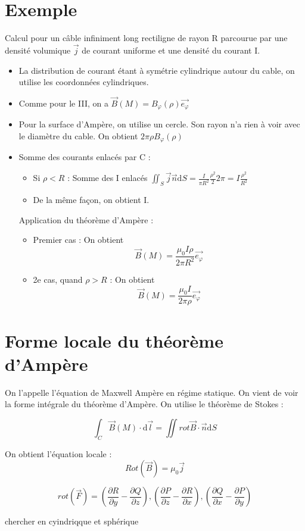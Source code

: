 \documentclass[french]{yLectureNote}
\renewcommand{\vec}{\overrightarrow}
\newcommand{\dd}{\mathrm{d}}
\newcommand{\B}{\vec{B}(M)}
\newcommand{\ep}{\vec{e_{\varphi}}}
\begin{document}
\section{Exemple}
Calcul pour un c\^able infiniment long rectiligne de rayon R parcourue par une densité volumique \(\vec{j}\) de courant uniforme et une densité du courant I.
\warningInfo{Remarque : Lien entre I et j}{\[I = \iint \vec{j}\cdot \vec{n}\dd S = j \pi R^2\]}
\begin{itemize}
 \item La distribution de courant étant à symétrie cylindrique autour du cable, on utilise les coordonnées cylindriques.
 \item Comme pour le III, on a \(\B = B_{\varphi}(\rho)\ep\)
 \item Pour la surface d'Ampère, on utilise un cercle. Son rayon n'a rien à voir avec le diamètre du cable. On obtient \(2\pi\rho B_{\varphi}(\rho)\)
 \item Somme des courants enlacés par C :
 \begin{itemize}
  \item Si \(\rho < R\) : Somme des I enlacés \(\iint_S \vec{j}\vec{n}\dd S = \frac{I}{\pi R^2}\frac{\rho^2}{2}2\pi = I\frac{\rho^2}{R^2}\)
  \item De la m\^eme façon, on obtient I.
 \end{itemize}
Application du théorème d'Ampère :
\begin{itemize}
 \item Premier cas : On obtient \[\B = \frac{\mu_0 I\rho}{2\pi R^2}\ep\]
 \item 2e cas, quand \(\rho>R\) : On obtient \[\B = \frac{\mu_0 I}{2\pi \rho}\ep\]
\end{itemize}
\end{itemize}
\section{Forme locale du théorème d'Ampère}
On l'appelle l'équation de Maxwell Ampère en régime statique. On vient de voir la forme intégrale du théorème d'Ampère. On utilise le théorème de Stokes :
\begin{theorem}
 \[\int_C \B \cdot \dd \vec{l} = \iint rot \vec{B}\cdot \vec{n}\dd S\]
\end{theorem}
On obtient l'équation locale :
\[Rot(\vec{B})=\mu_0 \vec{j}\]

\begin{definition}[Rotationnel]
\[rot(\vec{F}) = (\frac{\partial R}{\partial y}-\frac{\partial Q}{\partial z}),  (\frac{\partial P}{\partial z}-\frac{\partial R}{\partial x}),  (\frac{\partial Q}{\partial x}-\frac{\partial P}{\partial y})\]
\end{definition}
chercher en cyindriqque et sphérique
 
\end{document}
